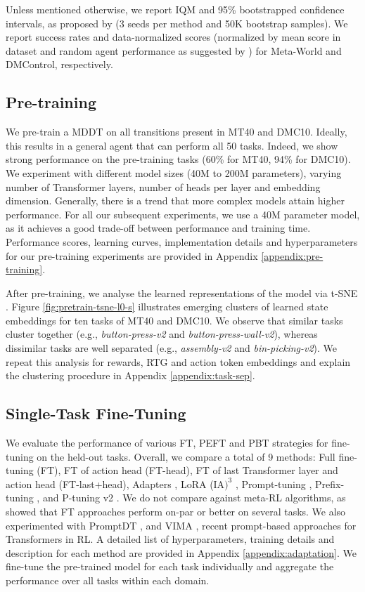 \documentclass{article}
\begin{document}
Unless mentioned otherwise, we report IQM and 95\% bootstrapped confidence intervals, as proposed by \citet{Agarwal:21} ($3$ seeds per method and 50K bootstrap samples). 
We report success rates and data-normalized scores (normalized by mean score in dataset and random agent performance as suggested by \citet{Fu:20}) for Meta-World and DMControl, respectively. 


\subsection{Pre-training} \label{sec:exp-pretrain}
We pre-train a MDDT on all transitions present in MT40 and DMC10. 
Ideally, this results in a general agent that can perform all 50 tasks.
Indeed, we show strong performance on the pre-training tasks (60\% for MT40, 94\% for DMC10). 
We experiment with different model sizes (40M to 200M parameters), varying number of Transformer layers, number of heads per layer and embedding dimension. 
Generally, there is a trend that more complex models attain higher performance. 
For all our subsequent experiments, we use a 40M parameter model, as it achieves a good trade-off between performance and training time. 
Performance scores, learning curves, implementation details and hyperparameters for our pre-training experiments are provided in Appendix \ref{appendix:pre-training}.


After pre-training, we analyse the learned representations of the model via t-SNE \citep{Van:08}. 
Figure \ref{fig:pretrain-tsne-l0-s} illustrates emerging clusters of learned state embeddings for ten tasks of MT40 and DMC10. 
We observe that similar tasks cluster together (e.g., \textit{button-press-v2} and \textit{button-press-wall-v2}), whereas dissimilar tasks are well separated (e.g., \textit{assembly-v2} and \textit{bin-picking-v2}). 
We repeat this analysis for rewards, RTG and action token embeddings and explain the clustering procedure in Appendix \ref{appendix:task-sep}. 


\subsection{Single-Task Fine-Tuning}
\label{sec:exp-adaptation}

We evaluate the performance of various FT, PEFT and PBT strategies for fine-tuning on the held-out tasks.
Overall, we compare a total of 9 methods: Full fine-tuning (FT), FT of action head (FT-head), FT of last Transformer layer and action head (FT-last+head), Adapters \citep{Houlsby:19}, LoRA \citep{Hu:21} (IA$\text{)}^3$ \citep{Liu:22}, Prompt-tuning \citep{Lester:21}, Prefix-tuning \citep{Xiang:21}, and P-tuning v2 \citep{Liu:21a}. 
We do not compare against meta-RL algorithms, as \citet{Mandi:22} showed that FT approaches perform on-par or better on several tasks.
We also experimented with PromptDT \citep{Xu:22}, and VIMA \citep{Jiang:22}, recent prompt-based approaches for Transformers in RL.
A detailed list of hyperparameters, training details and description for each method are provided in Appendix \ref{appendix:adaptation}. 
We fine-tune the pre-trained model for each task individually and aggregate the performance over all tasks within each domain.
\end{document}
